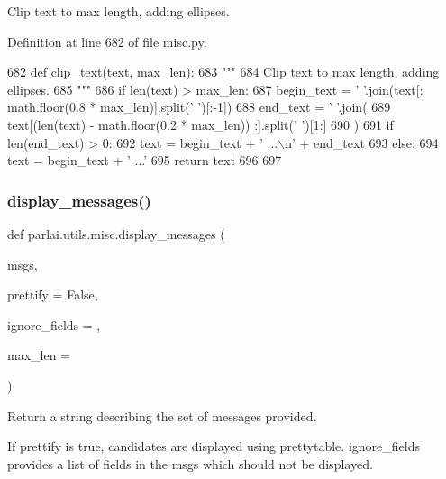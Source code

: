 \begin{DoxyVerb}Clip text to max length, adding ellipses.
\end{DoxyVerb}
 

Definition at line 682 of file misc.\+py.


\begin{DoxyCode}
682 \textcolor{keyword}{def }\hyperlink{namespaceparlai_1_1utils_1_1misc_a219b248f4399036a381ca859aa97433e}{clip\_text}(text, max\_len):
683     \textcolor{stringliteral}{"""}
684 \textcolor{stringliteral}{    Clip text to max length, adding ellipses.}
685 \textcolor{stringliteral}{    """}
686     \textcolor{keywordflow}{if} len(text) > max\_len:
687         begin\_text = \textcolor{stringliteral}{' '}.join(text[: math.floor(0.8 * max\_len)].split(\textcolor{stringliteral}{' '})[:-1])
688         end\_text = \textcolor{stringliteral}{' '}.join(
689             text[(len(text) - math.floor(0.2 * max\_len)) :].split(\textcolor{stringliteral}{' '})[1:]
690         )
691         \textcolor{keywordflow}{if} len(end\_text) > 0:
692             text = begin\_text + \textcolor{stringliteral}{' ...\(\backslash\)n'} + end\_text
693         \textcolor{keywordflow}{else}:
694             text = begin\_text + \textcolor{stringliteral}{' ...'}
695     \textcolor{keywordflow}{return} text
696 
697 
\end{DoxyCode}
\mbox{\label{namespaceparlai_1_1utils_1_1misc_a146f303a4c4b34993458968c74b55d2f}} 
\subsubsection{\texorpdfstring{display\+\_\+messages()}{display\_messages()}}
{\footnotesize\ttfamily def parlai.\+utils.\+misc.\+display\+\_\+messages (\begin{DoxyParamCaption}\item[{}]{msgs,  }\item[{}]{prettify = {\ttfamily False},  }\item[{}]{ignore\+\_\+fields = {\ttfamily \textquotesingle{}\textquotesingle{}},  }\item[{}]{max\+\_\+len = {} }\end{DoxyParamCaption})}

\begin{DoxyVerb}Return a string describing the set of messages provided.

If prettify is true, candidates are displayed using prettytable. ignore_fields
provides a list of fields in the msgs which should not be displayed.
\end{DoxyVerb}
 


